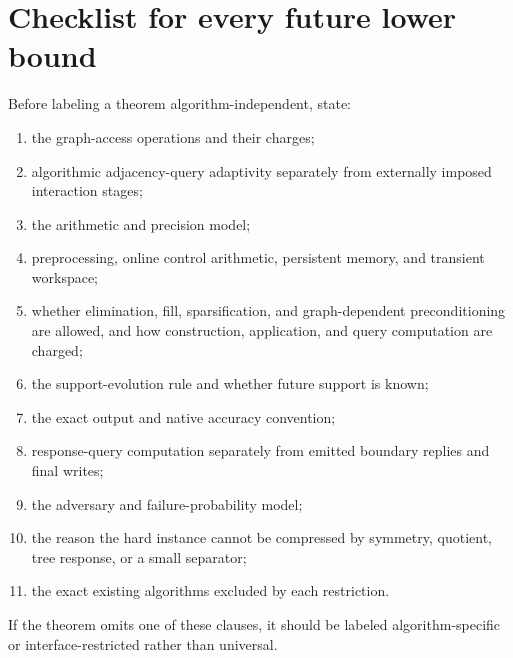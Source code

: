 \section{Checklist for every future lower bound}
\label{sec:checklist}

Before labeling a theorem algorithm-independent, state:

\begin{enumerate}
\item the graph-access operations and their charges;
\item algorithmic adjacency-query adaptivity separately from externally
      imposed interaction stages;
\item the arithmetic and precision model;
\item preprocessing, online control arithmetic, persistent memory, and
      transient workspace;
\item whether elimination, fill, sparsification, and graph-dependent
      preconditioning are allowed, and how construction, application, and
      query computation are charged;
\item the support-evolution rule and whether future support is known;
\item the exact output and native accuracy convention;
\item response-query computation separately from emitted boundary replies and
      final writes;
\item the adversary and failure-probability model;
\item the reason the hard instance cannot be compressed by symmetry, quotient,
      tree response, or a small separator;
\item the exact existing algorithms excluded by each restriction.
\end{enumerate}

If the theorem omits one of these clauses, it should be labeled
algorithm-specific or interface-restricted rather than universal.

